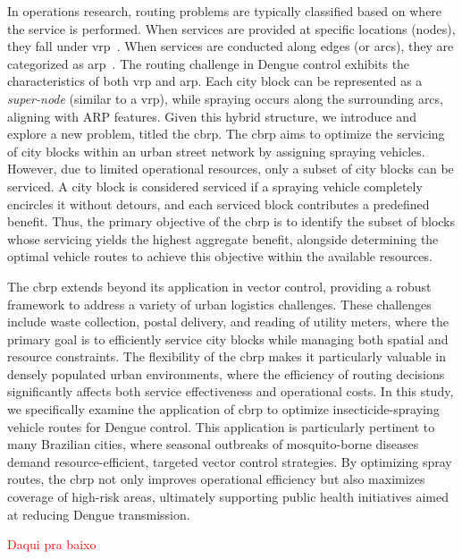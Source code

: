 In operations research, routing problems are typically classified based on where the service is performed. When services are provided at specific locations (nodes), they fall under \gls{vrp}~\citep{braekers2016vehicle}. When services are conducted along edges (or arcs), they are categorized as \gls{arp}~\citep{corberan2021arc}. The routing challenge in Dengue control exhibits the characteristics of both \gls{vrp} and \gls{arp}. Each city block can be represented as a \textit{super-node} (similar to a \gls{vrp}), while spraying occurs along the surrounding arcs, aligning with ARP features. Given this hybrid structure, we introduce and explore a new problem, titled the \gls{cbrp}. The \gls{cbrp} aims to optimize the servicing of city blocks within an urban street network by assigning spraying vehicles. However, due to limited operational resources, only a subset of city blocks can be serviced. A city block is considered serviced if a spraying vehicle completely encircles it without detours, and each serviced block contributes a predefined benefit. Thus, the primary objective of the \gls{cbrp} is to identify the subset of blocks whose servicing yields the highest aggregate benefit, alongside determining the optimal vehicle routes to achieve this objective within the available resources.

The \gls{cbrp} extends beyond its application in vector control, providing a robust framework to address a variety of urban logistics challenges. These challenges include waste collection, postal delivery, and reading of utility meters, where the primary goal is to efficiently service city blocks while managing both spatial and resource constraints. The flexibility of the \gls{cbrp} makes it particularly valuable in densely populated urban environments, where the efficiency of routing decisions significantly affects both service effectiveness and operational costs. In this study, we specifically examine the application of \gls{cbrp} to optimize insecticide-spraying vehicle routes for Dengue control. This application is particularly pertinent to many Brazilian cities, where seasonal outbreaks of mosquito-borne diseases demand resource-efficient, targeted vector control strategies. By optimizing spray routes, the \gls{cbrp} not only improves operational efficiency but also maximizes coverage of high-risk areas, ultimately supporting public health initiatives aimed at reducing Dengue transmission.

\textcolor{red}{Daqui pra baixo}

